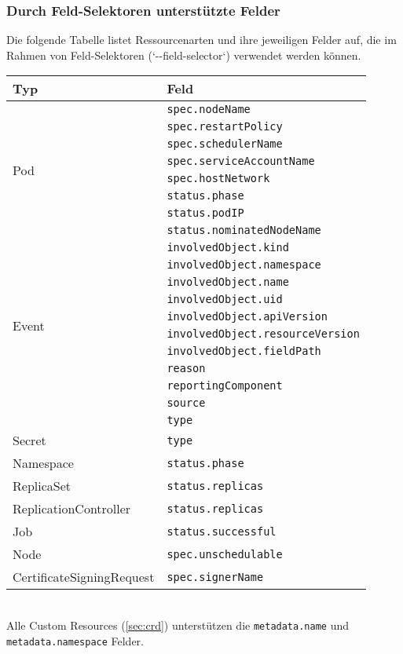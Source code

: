 \subsubsection{Durch Feld-Selektoren unterstützte Felder}
Die folgende Tabelle listet Ressourcenarten und ihre jeweiligen Felder auf, die im Rahmen von Feld-Selektoren (`{-}{-}field-selector`) verwendet werden können.\\
\begin{table}[htbp]
\centering
\begin{tabular}{|p{}|p{}|}
\hline
\textbf{Typ} & \textbf{Feld} \\
\hline
\multirow{8}{*}{Pod} 
& \texttt{spec.nodeName} \\
& \texttt{spec.restartPolicy} \\
& \texttt{spec.schedulerName} \\
& \texttt{spec.serviceAccountName} \\
& \texttt{spec.hostNetwork} \\
& \texttt{status.phase} \\
& \texttt{status.podIP} \\
& \texttt{status.nominatedNodeName} \\
\hline
\multirow{10}{*}{Event}
& \texttt{involvedObject.kind} \\
& \texttt{involvedObject.namespace} \\
& \texttt{involvedObject.name} \\
& \texttt{involvedObject.uid} \\
& \texttt{involvedObject.apiVersion} \\
& \texttt{involvedObject.resourceVersion} \\
& \texttt{involvedObject.fieldPath} \\
& \texttt{reason} \\
& \texttt{reportingComponent} \\
& \texttt{source} \\
& \texttt{type} \\
\hline
Secret & \texttt{type} \\
\hline
Namespace & \texttt{status.phase} \\
\hline
ReplicaSet & \texttt{status.replicas} \\
\hline
ReplicationController & \texttt{status.replicas} \\
\hline
Job & \texttt{status.successful} \\
\hline
Node & \texttt{spec.unschedulable} \\
\hline
CertificateSigningRequest & \texttt{spec.signerName} \\
\hline
\end{tabular}
\label{tab:feldselektoren}
\end{table}\\
Alle Custom Resources (\ref{sec:crd}) unterstützen die \texttt{metadata.name} und \texttt{metadata.namespace} Felder.


